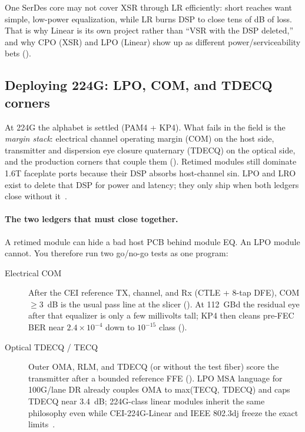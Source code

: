 One SerDes core may not cover XSR through LR efficiently: short reaches want
simple, low-power equalization, while LR burns DSP to close tens of dB of loss.
That is why Linear is its own project rather than ``VSR with the DSP deleted,''
and why CPO (XSR) and LPO (Linear) show up as different power/serviceability bets
().

\subsection{Deploying 224G: LPO, COM, and TDECQ corners}
\label{sec:224g-deploy}

At 224G the alphabet is settled (PAM4 + KP4). What fails in the field is the
\emph{margin stack}: electrical channel operating margin (COM) on the host side,
transmitter and dispersion eye closure quaternary (TDECQ) on the optical side,
and the production corners that couple them (). Retimed
modules still dominate 1.6T faceplate ports because their DSP absorbs host-channel
sin. LPO and LRO exist to delete that DSP for power and latency; they only ship
when both ledgers close without it~.

\paragraph{The two ledgers that must close together.}
A retimed module can hide a bad host PCB behind module EQ. An LPO module cannot.
You therefore run two go/no-go tests as one program:

\begin{description}
\item[Electrical COM] After the CEI reference TX, channel, and Rx (CTLE + 8-tap
      DFE), COM $\ge3$~dB is the usual pass line at the slicer
      (). At 112~GBd the residual eye after that
      equalizer is only a few millivolts tall; KP4 then cleans pre-FEC BER near
      $2.4\times10^{-4}$ down to $10^{-15}$ class ().
\item[Optical TDECQ / TECQ] Outer OMA, RLM, and TDECQ (or  without the test
      fiber) score the transmitter after a bounded reference FFE
      (). LPO MSA language for 100G/lane DR already couples OMA
      to max(TECQ, TDECQ) and caps TDECQ near 3.4~dB; 224G-class linear modules
      inherit the same philosophy even while CEI-224G-Linear and IEEE 802.3dj
      freeze the exact limits~.
\end{description}

